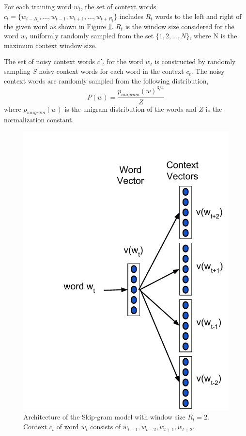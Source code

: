 \documentclass[11pt,a4paper]{article}
\begin{document}
For each training word $w_t$, the set of context words $c_{t} = \{ w_{t-R_{t}}, \ldots, w_{t-1}, w_{t+1}, \ldots, w_{t+R_{t}} \}$ includes $R_{t}$ words to the left and right of the given word as shown in Figure \ref{fig1}. $R_{t}$ is the window size considered for the word $w_t$ uniformly randomly sampled from the set $\{1, 2, \ldots, N\}$, where N is the maximum context window size.

The set of noisy context words $c'_{t}$ for the word $w_{t}$ is constructed by randomly sampling  $S$ noisy context words for each word in the context $c_t$.  The noisy context words are randomly sampled from the following distribution, 
\begin{equation}
P(w) = \frac{p_{unigram}(w)^{3/4}}{Z} 
\end{equation}
where $p_{unigram}(w)$ is the unigram distribution of the words and $Z$ is the normalization constant.

\begin{figure}
\includegraphics[scale=0.43]{images/sg_google.pdf}
\caption{Architecture of the Skip-gram model with window size $R_{t}=2$.  Context $c_t$ of word $w_t$  consists of $w_{t-1}, w_{t-2}, w_{t+1}, w_{t+2}$.}
\label{fig1}
\end{figure}
\end{document}
